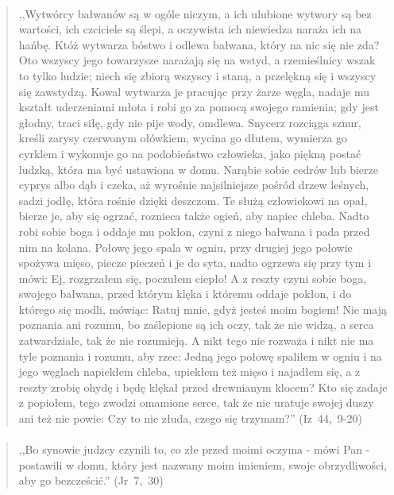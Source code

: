 \documentclass[10pt,a4paper,oneside]{article}
\begin{document}
\paragraph{}
\begin{quote}
,,Wytwórcy bałwanów są w ogóle niczym, a ich ulubione wytwory są bez wartości, ich czciciele są ślepi, a oczywista ich niewiedza naraża ich na hańbę. Któż wytwarza bóstwo i odlewa bałwana, który na nic się nie zda? Oto wszyscy jego towarzysze narażają się na wstyd, a rzemieślnicy wszak to tylko ludzie; niech się zbiorą wszyscy i staną, a przelękną się i wszyscy się zawstydzą. Kowal wytwarza je pracując przy żarze węgla, nadaje mu kształt uderzeniami młota i robi go za pomocą swojego ramienia; gdy jest głodny, traci siłę, gdy nie pije wody, omdlewa. Snycerz rozciąga sznur, kreśli zarysy czerwonym ołówkiem, wycina go dłutem, wymierza go cyrklem i wykonuje go na podobieństwo człowieka, jako piękną postać ludzką, która ma być ustawiona w domu. Narąbie sobie cedrów lub bierze cyprys albo dąb i czeka, aż wyrośnie najsilniejsze pośród drzew leśnych, sadzi jodłę, która rośnie dzięki deszczom. Te służą człowiekowi na opał, bierze je, aby się ogrzać, roznieca także ogień, aby napiec chleba. Nadto robi sobie boga i oddaje mu pokłon, czyni z niego bałwana i pada przed nim na kolana. Połowę jego spala w ogniu, przy drugiej jego połowie spożywa mięso, piecze pieczeń i je do syta, nadto ogrzewa się przy tym i mówi: Ej, rozgrzałem się, poczułem ciepło! A z reszty czyni sobie boga, swojego bałwana, przed którym klęka i któremu oddaje pokłon, i do którego się modli, mówiąc: Ratuj mnie, gdyż jesteś moim bogiem! Nie mają poznania ani rozumu, bo zaślepione są ich oczy, tak że nie widzą, a serca zatwardziałe, tak że nie rozumieją. A nikt tego nie rozważa i nikt nie ma tyle poznania i rozumu, aby rzec: Jedną jego połowę spaliłem w ogniu i na jego węglach napiekłem chleba, upiekłem też mięso i najadłem się, a z reszty zrobię ohydę i będę klękał przed drewnianym klocem? Kto się zadaje z popiołem, tego zwodzi omamione serce, tak że nie uratuje swojej duszy ani też nie powie: Czy to nie złuda, czego się trzymam?'' \mbox{(Iz 44, 9-20)}
\end{quote}
\paragraph{}
\begin{quote}
,,Bo synowie judzcy czynili to, co złe przed moimi oczyma - mówi Pan - postawili w domu, który jest nazwany moim imieniem, swoje obrzydliwości, aby go bezcześcić.'' \mbox{(Jr 7, 30)}
\end{quote}
\end{document}
